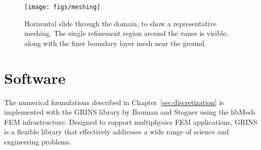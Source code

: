   \begin{figure}[!htb]
    \begin{center}
     \texttt{[image: figs/meshing]}
     \caption{Horizontal slide through the domain, to show a
     representative meshing. The single refinement region around the
     vanes is visible, along with the finer boundary layer mesh near the
     ground.}
     \label{fig:meshing}
    \end{center}
  \end{figure}





\section{Software}

The numerical formulations described in Chapter~\ref{sec:discretization}
is implemented with the GRINS library\cite{GRINSpaper} by Bauman
and Stogner using the libMesh\cite{libMeshPaper} FEM
infrastructure. Designed to support multiphysics FEM applications, 
GRINS is a flexible library that effectively addresses a wide range of 
science and engineering problems.   
 



